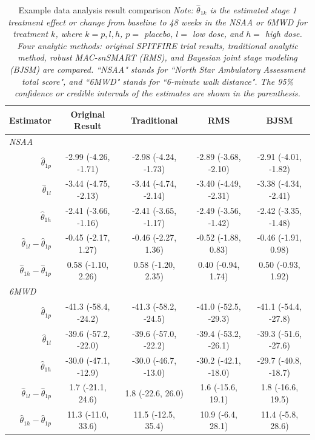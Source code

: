 \begin{table} 
\caption{\label{tab:comp} \centering Example data analysis result comparison\protect\linebreak
\small
\textit{Note: $\widehat{\theta}_{1k}$ is the estimated stage 1 treatment effect or change from baseline to 48 weeks in the NSAA or 6MWD for treatment $k$, where $k = p,l,h$, $p = $ placebo, $l = $ low dose, and $h = $ high dose. Four analytic methods: original SPITFIRE trial results, traditional analytic method, robust MAC-snSMART (RMS), and  Bayesian joint stage modeling (BJSM) are compared. ``NSAA" stands for ``North Star Ambulatory Assessment total score", and ``6MWD" stands for ``6-minute walk distance". The 95\% confidence or credible intervals of the estimates are shown in the parenthesis.}}
\centering
\begin{tabular}{ccccc}
\hline
Estimator &  Original Result &  Traditional &  RMS  & BJSM \tabularnewline
\hline
\multicolumn{1}{l}{\textit{NSAA}} &&&&\\
\multicolumn{1}{r}{$\widehat{\theta}_{1p}$} &  -2.99 (-4.26, -1.71) &  -2.98 (-4.24, -1.73) &  -2.89 (-3.68, -2.10) &  -2.91 (-4.01, -1.82)  \tabularnewline 

\multicolumn{1}{r}{$\widehat{\theta}_{1l}$}  &  -3.44 (-4.75, -2.13) &  -3.44 (-4.74, -2.14) &  -3.40 (-4.49, -2.31) &  -3.38 (-4.34, -2.41)  \tabularnewline

\multicolumn{1}{r}{$\widehat{\theta}_{1h}$} &  -2.41 (-3.66, -1.16) &  -2.41 (-3.65, -1.17)  &  -2.49 (-3.56, -1.42) &   -2.42 (-3.35, -1.48) \tabularnewline

\multicolumn{1}{r}{$\widehat{\theta}_{1l} - \widehat{\theta}_{1p}$} &  -0.45 (-2.17, 1.27) &  -0.46 (-2.27, 1.36)  &  -0.52 (-1.88, 0.83) &  -0.46 (-1.91, 0.98)  \tabularnewline
\multicolumn{1}{r}{$\widehat{\theta}_{1h} - \widehat{\theta}_{1p}$} &  	0.58 (-1.10, 2.26) &  0.58 (-1.20, 2.35)  &  0.40 (-0.94, 1.74) &  0.50 (-0.93, 1.92)\tabularnewline
\hline
\multicolumn{1}{l}{\textit{6MWD}} &&&&\\
\multicolumn{1}{r}{$\widehat{\theta}_{1p}$} &  -41.3 (-58.4, -24.2) &  -41.3 (-58.2, -24.5)  &  -41.0 (-52.5, -29.3) &  -41.1 (-54.4, -27.8) \tabularnewline 

\multicolumn{1}{r}{$\widehat{\theta}_{1l}$} &  -39.6 (-57.2, -22.0) &  -39.6 (-57.0, -22.2)  &  -39.4 (-53.2, -26.1) &  -39.3 (-51.6, -27.6) \tabularnewline

\multicolumn{1}{r}{$\widehat{\theta}_{1h}$} &  -30.0 (-47.1, -12.9) &  -30.0 (-46.7, -13.0)  &  -30.2 (-42.1, -18.0) &   -29.7 (-40.8, -18.7)\tabularnewline

\multicolumn{1}{r}{$\widehat{\theta}_{1l} - \widehat{\theta}_{1p}$} &  1.7 (-21.1, 24.6) &  1.8 (-22.6, 26.0)  &  1.6 (-15.6, 19.1) &  1.8 (-16.6, 19.5)   \tabularnewline
\multicolumn{1}{r}{$\widehat{\theta}_{1h} - \widehat{\theta}_{1p}$} &  11.3 (-11.0, 33.6) &  11.5 (-12.5, 35.4)  &  10.9 (-6.4, 28.1) &  11.4 (-5.8, 28.6) \tabularnewline
\hline
\end{tabular}
\end{table}

